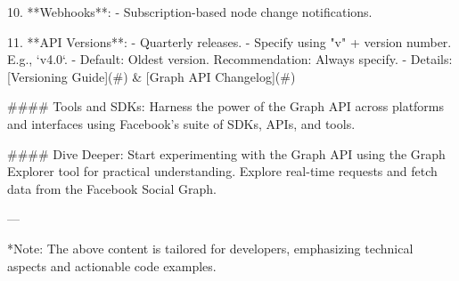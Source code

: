 10. **Webhooks**:
   - Subscription-based node change notifications.
   
11. **API Versions**: 
   - Quarterly releases.
   - Specify using "v" + version number. E.g., `v4.0`.
   - Default: Oldest version. Recommendation: Always specify.
   - Details: [Versioning Guide](#) & [Graph API Changelog](#)

#### Tools and SDKs:
Harness the power of the Graph API across platforms and interfaces using Facebook's suite of SDKs, APIs, and tools.

#### Dive Deeper:
Start experimenting with the Graph API using the Graph Explorer tool for practical understanding. Explore real-time requests and fetch data from the Facebook Social Graph. 

---

*Note: The above content is tailored for developers, emphasizing technical aspects and actionable code examples.